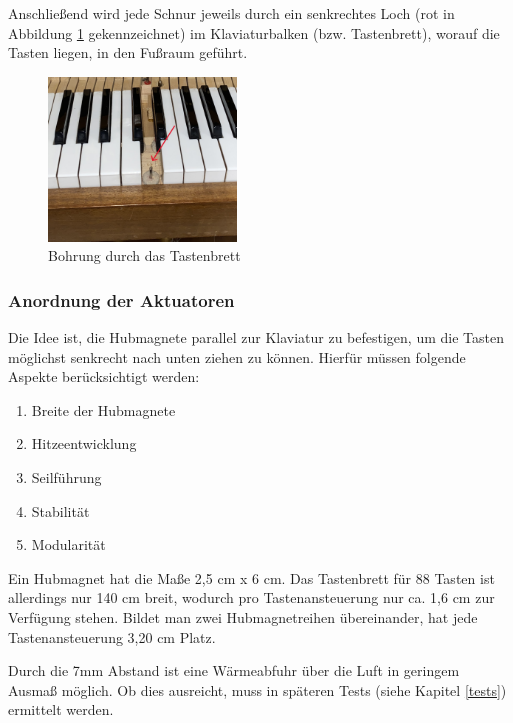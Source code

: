 Anschließend wird jede Schnur jeweils durch ein senkrechtes Loch (rot in Abbildung \ref{fig:klaviatur} gekennzeichnet) im Klaviaturbalken (bzw. Tastenbrett), %
worauf die Tasten liegen, in den Fußraum geführt.

\begin{figure}[htbp]
	\centering
	\includegraphics[width=5cm]{img/Klaviatur.jpg}
	\caption{Bohrung durch das Tastenbrett}
	\label{fig:klaviatur}
\end{figure}

\subsubsection{Anordnung der Aktuatoren}

Die Idee ist, die Hubmagnete parallel zur Klaviatur zu befestigen, um die Tasten möglichst senkrecht nach unten ziehen zu können.
Hierfür müssen folgende Aspekte berücksichtigt werden:

\begin{enumerate}
	\item Breite der Hubmagnete
	\item Hitzeentwicklung
	\item Seilführung
	\item Stabilität
	\item Modularität
\end{enumerate}

Ein Hubmagnet hat die Maße 2,5 cm x 6 cm.
Das Tastenbrett für 88 Tasten ist allerdings nur 140 cm breit, wodurch pro Tastenansteuerung nur ca. 1,6 cm zur Verfügung stehen.
Bildet man zwei Hubmagnetreihen übereinander, hat jede Tastenansteuerung 3,20 cm Platz.

Durch die 7mm Abstand ist eine Wärmeabfuhr über die Luft in geringem Ausmaß möglich.
Ob dies ausreicht, muss in späteren Tests (siehe Kapitel \ref{tests}) ermittelt werden.

